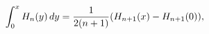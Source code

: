 \[\int_{0}^{x}\mathop{H_{n}\/}\nolimits\!\left(y\right)dy=\frac{1}{2(n+1)}(%
\mathop{H_{n+1}\/}\nolimits\!\left(x\right)-\mathop{H_{n+1}\/}\nolimits\!\left%
(0\right)),\]